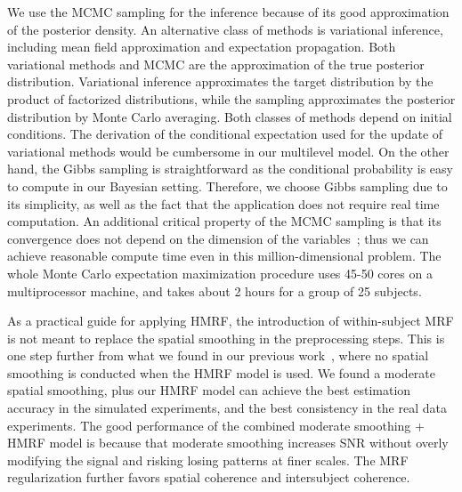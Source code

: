 \documentclass[review,authoryear]{elsarticle}
\begin{document}
We use the MCMC sampling for the inference because of its good approximation of
the posterior density. An alternative class of methods is variational inference,
including mean field approximation and expectation propagation. Both variational
methods and MCMC are the approximation of the true posterior
distribution. Variational inference approximates the target distribution by the
product of factorized distributions, while the sampling approximates the
posterior distribution by Monte Carlo averaging. Both classes of methods depend
on initial conditions. The derivation of the conditional expectation
used for the update of variational methods would be cumbersome in our multilevel
model. On the other hand, the Gibbs sampling is straightforward as the
conditional probability is easy to compute in our Bayesian setting. Therefore,
we choose Gibbs sampling due to its simplicity, as well as the fact that the
application does not require real time computation. An additional critical
property of the MCMC sampling is that its convergence does not depend on the
dimension of the variables~\citep{robert2005monte}; thus we can achieve
reasonable compute time even in this million-dimensional problem. The whole
Monte Carlo expectation maximization procedure uses 45-50 cores on a
multiprocessor machine, and takes about 2 hours for a group of 25 subjects.

As a practical guide for applying HMRF, the introduction of within-subject MRF
is not meant to replace the spatial smoothing in the preprocessing steps. This
is one step further from what we found in our previous
work~\citep{liu2012group}, where no spatial smoothing is conducted when the HMRF
model is used. We found a moderate spatial smoothing, plus our HMRF model can
achieve the best estimation accuracy in the simulated experiments, and the best
consistency in the real data experiments. The good performance of the combined
moderate smoothing + HMRF model is because that moderate smoothing increases SNR
without overly modifying the signal and risking losing patterns at finer
scales. The MRF regularization further favors spatial coherence and intersubject
coherence.
\end{document}
